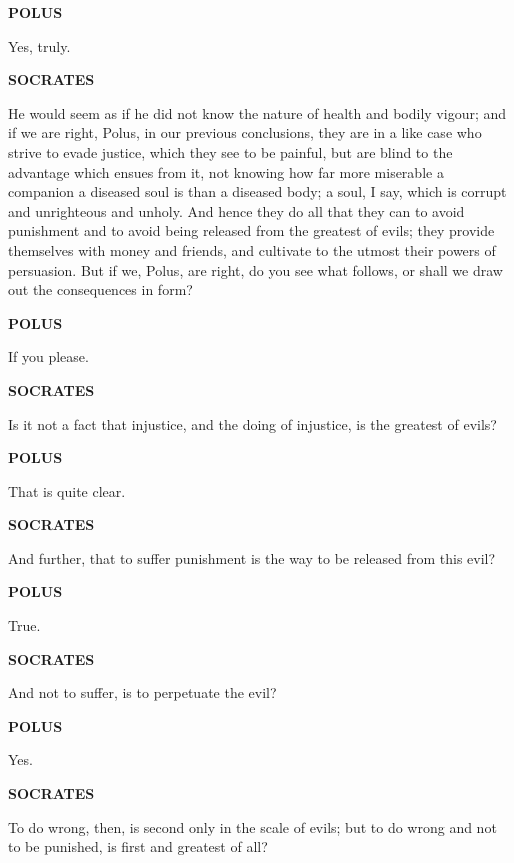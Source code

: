 \documentclass[11pt,letter]{article}
\begin{document}
\par \textbf{POLUS}
\par   Yes, truly.

\par \textbf{SOCRATES}
\par   He would seem as if he did not know the nature of health and bodily vigour; and if we are right, Polus, in our previous conclusions, they are in a like case who strive to evade justice, which they see to be painful, but are blind to the advantage which ensues from it, not knowing how far more miserable a companion a diseased soul is than a diseased body; a soul, I say, which is corrupt and unrighteous and unholy. And hence they do all that they can to avoid punishment and to avoid being released from the greatest of evils; they provide themselves with money and friends, and cultivate to the utmost their powers of persuasion. But if we, Polus, are right, do you see what follows, or shall we draw out the consequences in form?

\par \textbf{POLUS}
\par   If you please.

\par \textbf{SOCRATES}
\par   Is it not a fact that injustice, and the doing of injustice, is the greatest of evils?

\par \textbf{POLUS}
\par   That is quite clear.

\par \textbf{SOCRATES}
\par   And further, that to suffer punishment is the way to be released from this evil?

\par \textbf{POLUS}
\par   True.

\par \textbf{SOCRATES}
\par   And not to suffer, is to perpetuate the evil?

\par \textbf{POLUS}
\par   Yes.

\par \textbf{SOCRATES}
\par   To do wrong, then, is second only in the scale of evils; but to do wrong and not to be punished, is first and greatest of all?
\end{document}
